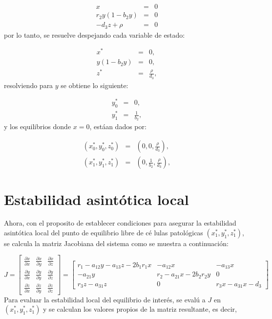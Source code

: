 \documentclass[letterpaper,11pt]{article}
\begin{document}
\begin{eqnarray*}
x &=&0 \\
r_{2}y(1-b_{2}y) &=&0 \\
-d_{3}z+\rho &=&0
\end{eqnarray*}%
por lo tanto, se resuelve despejando cada variable de estado:

\begin{eqnarray*}
x^{\ast } &=&0, \\
y(1-b_{2}y) &=&0, \\
z^{\ast } &=&\frac{\rho }{d_{3}},
\end{eqnarray*}%
resolviendo para $y$ se obtiene lo siguiente:

\begin{eqnarray*}
y_{0}^{\ast } &=&0, \\
y_{1}^{\ast } &=&\frac{1}{b_{2}},
\end{eqnarray*}%
y los equilibrios donde $x=0$, est\'{a}an dados por:

\begin{eqnarray*}
(x_{0}^{\ast },y_{0}^{\ast },z_{0}^{\ast }) &=&(0,0,\frac{\rho }{d_{3}}), \\
(x_{1}^{\ast },y_{1}^{\ast },z_{1}^{\ast }) &=&(0,\frac{1}{b_{2}},\frac{\rho 
}{d_{3}}),
\end{eqnarray*}

\section{Estabilidad asint\'{o}tica local}

Ahora, con el proposito de establecer condiciones para asegurar la
estabilidad asint\'{o}tica local del punto de equilibrio libre de c\'{e}%
lulas patol\'{o}gicas $(x_{1}^{\ast },y_{1}^{\ast },z_{1}^{\ast })$, se
calcula la matriz Jacobiana del sistema como se muestra a continuaci\'{o}n:

\begin{equation*}
J=\left[ 
\begin{array}{ccc}
\frac{\partial \dot{x}}{\partial x} & \frac{\partial \dot{x}}{\partial y} & 
\frac{\partial \dot{x}}{\partial z} \\ 
\frac{\partial \dot{y}}{\partial x} & \frac{\partial \dot{y}}{\partial y} & 
\frac{\partial \dot{y}}{\partial z} \\ 
\frac{\partial \dot{z}}{\partial x} & \frac{\partial \dot{z}}{\partial y} & 
\frac{\partial \dot{z}}{\partial z}%
\end{array}%
\right] =\left[ 
\begin{array}{ccc}
r_{1}-a_{12}y-a_{13}z-2b_{1}r_{1}x & -a_{12}x & -a_{13}x \\ 
-a_{21}y & r_{2}-a_{21}x-2b_{2}r_{2}y & 0 \\ 
r_{3}z-a_{31}z & 0 & r_{3}x-a_{31}x-d_{3}%
\end{array}%
\allowbreak \right]
\end{equation*}%
Para evaluar la estabilidad local del equilibrio de inter\'{e}s, se eval\'{u}%
a $J$ en $(x_{1}^{\ast },y_{1}^{\ast },z_{1}^{\ast })$ y se calculan los
valores propios de la matriz resultante, es decir,
\end{document}
